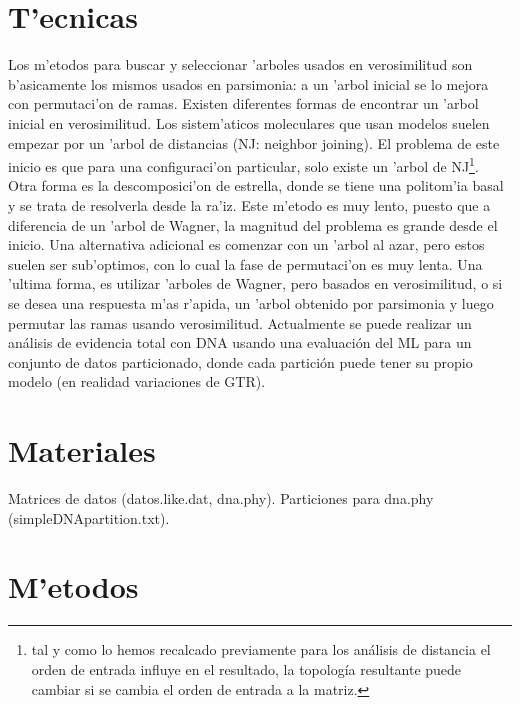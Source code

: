 \section{T'ecnicas}
Los m'etodos para buscar y seleccionar 'arboles usados en verosimilitud son b'asicamente los mismos usados en parsimonia: a un 'arbol inicial se lo mejora con permutaci'on de ramas. Existen diferentes formas de encontrar un 'arbol inicial en verosimilitud. Los sistem'aticos moleculares que usan modelos suelen empezar por un 'arbol de distancias (NJ: neighbor joining). El problema de este inicio es que para una configuraci'on particular, solo existe un 'arbol de NJ\footnote{tal y como lo hemos recalcado previamente para los an\'alisis de distancia el orden de entrada influye en el resultado, la topolog\'ia resultante puede cambiar si se cambia el orden de entrada a la matriz.}. Otra forma es la descomposici'on de estrella, donde se tiene una politom'ia basal y se trata de resolverla desde la ra'iz. Este m'etodo es muy lento, puesto que a diferencia de un 'arbol de Wagner, la magnitud del problema es grande desde el inicio. Una alternativa adicional es comenzar con un 'arbol al azar, pero estos suelen ser sub'optimos, con lo cual la fase de permutaci'on es muy lenta. Una 'ultima forma, es utilizar 'arboles de Wagner, pero basados en verosimilitud, o si se desea una respuesta m'as r'apida, un 'arbol obtenido por parsimonia y luego permutar las ramas usando verosimilitud.
Actualmente se puede realizar un an\'alisis de evidencia total con DNA 
usando una evaluaci\'on del ML para un conjunto de datos particionado, donde cada partici\'on puede tener su propio modelo (en realidad variaciones de GTR).




\section{Materiales}
\noindent
Matrices de datos (datos.like.dat, dna.phy).
Particiones para dna.phy (simpleDNApartition.txt).
\section{M'etodos}
